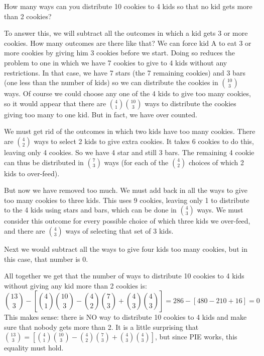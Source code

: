 \documentclass[12pt]{article}
\begin{document}
\begin{example}
How many ways can you distribute 10 cookies to 4 kids so that no kid gets more than 2 cookies?  

\begin{solution}
To answer this, we will subtract all the outcomes in which a kid gets 3 or more cookies.  How many outcomes are there like that?  We can force kid A to eat 3 or more cookies by giving him 3 cookies before we start.  Doing so reduces the problem to one in which we have 7 cookies to give to 4 kids without any restrictions.  In that case, we have 7 stars (the 7 remaining cookies) and 3 bars (one less than the number of kids) so we can distribute the cookies in ${10 \choose 3}$ ways.  Of course we could choose any one of the 4 kids to give too many cookies, so it would appear that there are ${4 \choose 1}{10 \choose 3}$ ways to distribute the cookies giving too many to one kid.  But in fact, we have over counted.  

We must get rid of the outcomes in which two kids have too many cookies.  There are ${4 \choose 2}$ ways to select 2 kids to give extra cookies.  It takes 6 cookies to do this, leaving only 4 cookies.  So we have 4 star and still 3 bars.  The remaining 4 cookie can thus be distributed in ${7 \choose 3}$ ways (for each of the ${4 \choose 2}$ choices of which 2 kids to over-feed).  

But now we have removed too much.  We must add back in all the ways to give too many cookies to three kids.  This uses 9 cookies, leaving only 1 to distribute to the 4 kids using stars and bars, which can be done in ${4 \choose 3}$ ways.  We must consider this outcome for every possible choice of which three kids we over-feed, and there are ${4 \choose 3}$ ways of selecting that set of 3 kids.

Next we would subtract all the ways to give four kids too many cookies, but in this case, that number is 0.

All together we get that the number of ways to distribute 10 cookies to 4 kids without giving any kid more than 2 cookies is:
\[{13 \choose 3} - \left[{4 \choose 1}{10 \choose 3} - {4 \choose 2}{7 \choose 3} + {4\choose 3}{4\choose 3}\right] = 286 - [480 - 210 + 16] = 0\]
This makes sense: there is NO way to distribute 10 cookies to 4 kids and make sure that nobody gets more than 2.  It is a little surprising that ${13 \choose 3} = \left[{4 \choose 1}{10 \choose 3} - {4 \choose 2}{7 \choose 3} + {4\choose 3}{4\choose 3}\right]$, but since PIE works, this equality must hold.
\end{solution}
\end{example}
\end{document}
